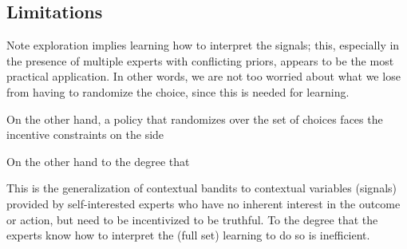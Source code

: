 



\subsection{Limitations}


Note exploration implies learning how to interpret the signals; this, especially in the presence of multiple experts with conflicting priors, appears to be the most practical application. In other words, we are not too worried about what we lose from having to randomize the choice, since this is needed for learning. 

On the other hand, a policy that randomizes over the set of choices faces the incentive constraints on the side 

On the other hand to the degree that 


This is the generalization of contextual bandits to contextual variables (signals) provided by self-interested experts who have no inherent interest in the outcome or action, but need to be incentivized to be truthful. 
To the degree that the experts know how to interpret the (full set) learning to do so is inefficient. 











